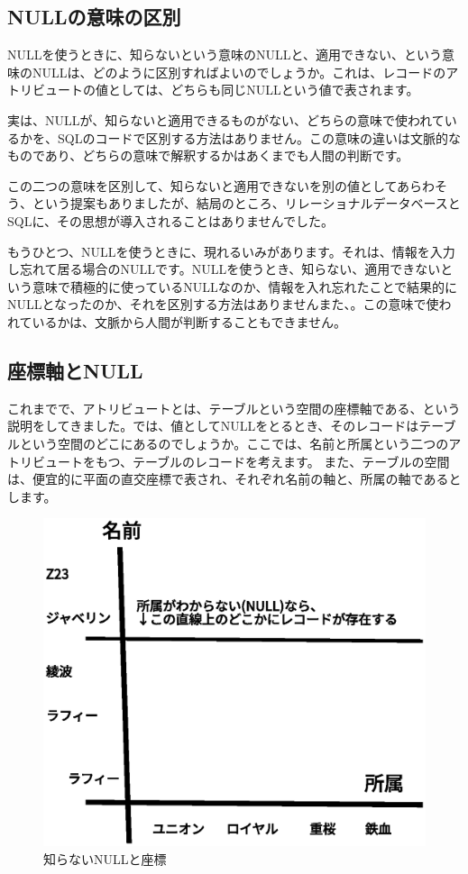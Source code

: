 \subsection{NULLの意味の区別}

NULLを使うときに、知らないという意味のNULLと、適用できない、という意味のNULLは、どのように区別すればよいのでしょうか。これは、レコードのアトリビュートの値としては、どちらも同じNULLという値で表されます。

実は、NULLが、知らないと適用できるものがない、どちらの意味で使われているかを、SQLのコードで区別する方法はありません。この意味の違いは文脈的なものであり、どちらの意味で解釈するかはあくまでも人間の判断です。

この二つの意味を区別して、知らないと適用できないを別の値としてあらわそう、という提案もありましたが、結局のところ、リレーショナルデータベースとSQLに、その思想が導入されることはありませんでした。

もうひとつ、NULLを使うときに、現れるいみがあります。それは、情報を入力し忘れて居る場合のNULLです。NULLを使うとき、知らない、適用できないという意味で積極的に使っているNULLなのか、情報を入れ忘れたことで結果的にNULLとなったのか、それを区別する方法はありませんまた、。この意味で使われているかは、文脈から人間が判断することもできません。

\subsection{座標軸とNULL}

これまでで、アトリビュートとは、テーブルという空間の座標軸である、という説明をしてきました。では、値としてNULLをとるとき、そのレコードはテーブルという空間のどこにあるのでしょうか。ここでは、名前と所属という二つのアトリビュートをもつ、テーブルのレコードを考えます。
また、テーブルの空間は、便宜的に平面の直交座標で表され、それぞれ名前の軸と、所属の軸であるとします。

\begin{figure}[htbp]
	\includegraphics[width=12cm,clip]{draw/unknown.eps}
	\caption{知らないNULLと座標}
	\label{fig:unknown_null}
\end{figure}

